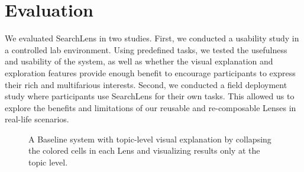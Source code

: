 \section{Evaluation}

We evaluated SearchLens in two studies. First, we conducted a usability study in a controlled lab environment. Using predefined tasks, we tested the usefulness and usability of the system, as well as whether the visual explanation and exploration features provide enough benefit to encourage participants to express their rich and multifarious interests. Second, we conducted a field deployment study where participants use SearchLens for their own tasks. This allowed us to explore the benefits and limitations of our reusable and re-composable Lenses in real-life scenarios.




\begin{figure}
    \centering
    \caption[Baseline system interface for the SearchLens lab study.]{A Baseline system with topic-level visual explanation by collapsing the colored cells in each Lens and visualizing results only at the topic level.} %
    \label{fig:sl_baseline}
\end{figure}


